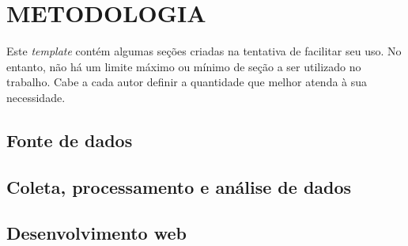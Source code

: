 \chapter{METODOLOGIA}

Este \textit{template} contém algumas seções criadas na tentativa de facilitar seu uso. No entanto, não há um limite máximo ou mínimo de seção a ser utilizado no trabalho. Cabe a cada autor definir a quantidade que melhor atenda à sua 
necessidade.  

\section{Fonte de dados}

\section{Coleta, processamento e análise de dados}

\section{Desenvolvimento web}
